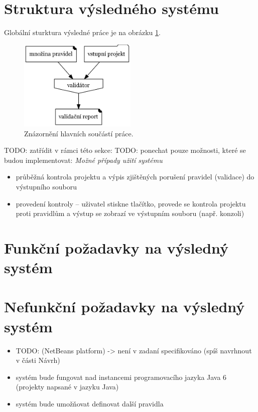 \section{Struktura výsledného systému}
Globální sturktura výsledné práce je na obrázku \ref{global_structure}.

\begin{figure}[h!]
  \centering
  \includegraphics[width=0.5\textwidth]{./graphs/global_structure.png}
  \caption{Znázornění hlavních součástí práce.\label{global_structure}}
\end{figure}

TODO: zatřídit v rámci této sekce:
TODO: ponechat pouze možnosti, které se budou implementovat:
\emph{Možné případy užití systému}
\begin{itemize}
\item průběžná kontrola projektu a výpis zjištěných porušení pravidel (validace) do výstupního souboru
\item provedení kontroly  -- uživatel stiskne tlačítko, provede se kontrola projektu proti pravidlům a výstup se zobrazí ve výstupním souboru (např. konzoli)
\end{itemize}

\section{Funkční požadavky na výsledný systém}

\section{Nefunkční požadavky na výsledný systém}
\begin{itemize}
\item TODO: (NetBeans platform) -> není v zadaní specifikováno (spíš navrhnout v části Návrh)
\item systém bude fungovat nad instancemi programovacího jazyka Java 6 (projekty napsané v jazyku Java)
\item systém bude umožňovat definovat další pravidla
\end{itemize}

